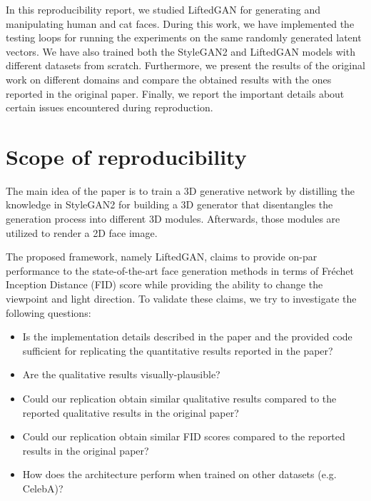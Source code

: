 In this reproducibility report, we studied LiftedGAN for generating and manipulating human and cat faces. During this work, we have implemented the testing loops for running the experiments on the same randomly generated latent vectors. We have also trained both the StyleGAN2 and LiftedGAN models with different datasets from scratch. Furthermore, we present the results of the original work on different domains and compare the obtained results with the ones reported in the original paper. Finally, we report the important details about certain issues encountered during reproduction.


\section{Scope of reproducibility}
\label{sec:claims}

The main idea of the paper is to train a 3D generative network by distilling the knowledge in StyleGAN2 for building a 3D generator that disentangles the generation process into different 3D modules. Afterwards, those modules are utilized to render a 2D face image.

The proposed framework, namely LiftedGAN, claims to provide on-par performance to the state-of-the-art face generation methods in terms of Fréchet Inception Distance (FID) \cite{heusel2018gans} score while providing the ability to change the viewpoint and light direction. To validate these claims, we try to investigate the following questions:
\begin{itemize}
    \item Is the implementation details described in the paper and the provided code sufficient for replicating the quantitative results reported in the paper?
    \item Are the qualitative results visually-plausible?
    \item Could our replication obtain similar qualitative results compared to the reported qualitative results in the original paper?
    \item Could our replication obtain similar FID scores compared to the reported results in the original paper?
    \item How does the architecture perform when trained on other datasets (e.g. CelebA)?
\end{itemize}


